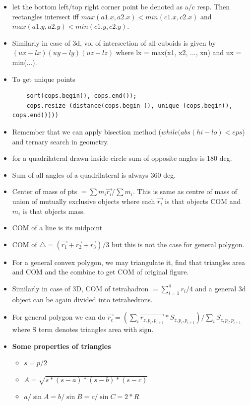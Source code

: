 \documentclass[8pt, a4paper, oneside, twocolumn]{extarticle}
\begin{document}
\begin{itemize}
    \item let the bottom left/top right corner point be denoted as a/c resp. Then rectangles intersect iff $max(a1.x, a2.x) < min(c1.x, c2.x)$ and $max(a1.y, a2.y) < min(c1.y, c2.y)$.
    \item Similarly in case of 3d, vol of intersection of all cuboids is given by $(ux - lx)(uy - ly)(uz - lz)$ where lx = max(x1, x2, ..., xn) and ux = min(...).
    \item To get unique points 
    \begin{verbatim}
    sort(cops.begin(), cops.end());
    cops.resize (distance(cops.begin (), unique (cops.begin(), cops.end())))
    \end{verbatim}
    \item Remember that we can apply bisection method ($while (abs(hi - lo) < eps$) and ternary search in geometry.
    \item for a quadrilateral drawn inside circle sum of opposite angles is 180 deg.
    \item Sum of all angles of a quadrilateral is always 360 deg.
    \item Center of mass of pts $= \sum m_i \vec{r_i}/\sum{m_i}$. This is same as centre of mass of union of mutually exclusive objects where each $\vec{r_i}$ is that objects COM and $m_i$ is that objects mass.
    \item COM of a line is its midpoint
    \item COM of $\triangle = (\vec{r_1} + \vec{r_2} + \vec{r_3}) / 3$ but this is not the case for general polygon.
    \item For a general convex polygon, we may triangulate it, find that triangles area and COM and the combine to get COM of original figure.
    \item Similarly in case of 3D, COM of tetrahadron $= \sum_{i = 1}^{4}r_i/4$ and a general 3d object can be again divided into tetrahedrons.
    \item For general polygon we can do $\vec{r_c} = (\sum_{i}\vec{r_{z,p_i, p_{i + 1}}} * S_{z, p_i, p_{i + 1}}) / \sum_i S_{z, p_i, p_{i + 1}}$ where S term denotes triangles area with sign. 
    \item \textbf{Some properties of triangles}
    \begin{itemize}
        \item $s = p/2$
        \item $A = \sqrt{s*(s - a)*(s - b)*(s - c)}$
        \item $a/\sin{A} = b/\sin{B} = c/\sin{C} = 2*R$

\end{itemize}
\end{itemize}
\end{document}
